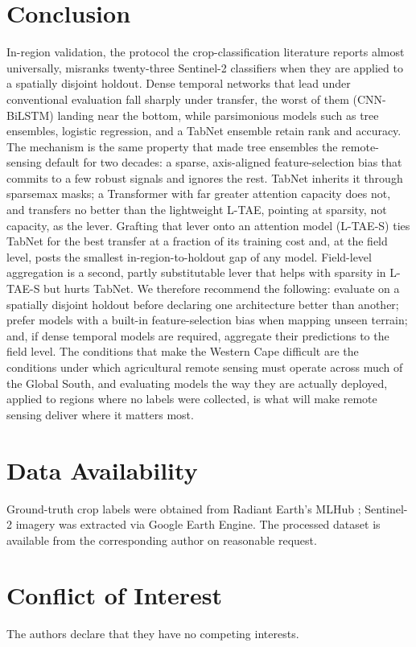 \documentclass[journal]{IEEEtran}
\begin{document}
\section{Conclusion}
In-region validation, the protocol the crop-classification literature reports almost universally, misranks twenty-three Sentinel-2 classifiers when they are applied to a spatially disjoint holdout. Dense temporal networks that lead under conventional evaluation fall sharply under transfer, the worst of them (CNN-BiLSTM) landing near the bottom, while parsimonious models such as tree ensembles, logistic regression, and a TabNet ensemble retain rank and accuracy. The mechanism is the same property that made tree ensembles the remote-sensing default for two decades: a sparse, axis-aligned feature-selection bias that commits to a few robust signals and ignores the rest. TabNet inherits it through sparsemax masks; a Transformer with far greater attention capacity does not, and transfers no better than the lightweight L-TAE, pointing at sparsity, not capacity, as the lever. Grafting that lever onto an attention model (L-TAE-S) ties TabNet for the best transfer at a fraction of its training cost and, at the field level, posts the smallest in-region-to-holdout gap of any model. Field-level aggregation is a second, partly substitutable lever that helps with sparsity in L-TAE-S but hurts TabNet. We therefore recommend the following: evaluate on a spatially disjoint holdout before declaring one architecture better than another; prefer models with a built-in feature-selection bias when mapping unseen terrain; and, if dense temporal models are required, aggregate their predictions to the field level. The conditions that make the Western Cape difficult are the conditions under which agricultural remote sensing must operate across much of the Global South, and evaluating models the way they are actually deployed, applied to regions where no labels were collected, is what will make remote sensing deliver where it matters most.

\section*{Data Availability}
Ground-truth crop labels were obtained from Radiant Earth's MLHub \cite{mlhub}; Sentinel-2 imagery was extracted via Google Earth Engine. The processed dataset is available from the corresponding author on reasonable request.

\section*{Conflict of Interest}
The authors declare that they have no competing interests.
\end{document}

